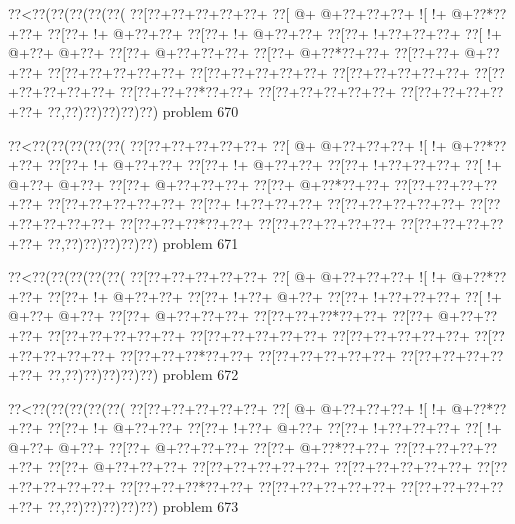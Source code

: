 \vbox{\vbox{\goo
\0??<\0??(\0??(\0??(\0??(\0??(
\0??[\0??+\0??+\0??+\0??+\0??+
\0??[\- @+\- @+\0??+\0??+\0??+
\- ![\- !+\- @+\0??*\0??+\0??+
\0??[\0??+\- !+\- @+\0??+\0??+
\0??[\0??+\- !+\- @+\0??+\0??+
\0??[\0??+\- !+\0??+\0??+\0??+
\0??[\- !+\- @+\0??+\- @+\0??+
\0??[\0??+\- @+\0??+\0??+\0??+
\0??[\0??+\- @+\0??*\0??+\0??+
\0??[\0??+\0??+\- @+\0??+\0??+
\0??[\0??+\0??+\0??+\0??+\0??+
\0??[\0??+\0??+\0??+\0??+\0??+
\0??[\0??+\0??+\0??+\0??+\0??+
\0??[\0??+\0??+\0??+\0??+\0??+
\0??[\0??+\0??+\0??*\0??+\0??+
\0??[\0??+\0??+\0??+\0??+\0??+
\0??[\0??+\0??+\0??+\0??+\0??+
\0??,\0??)\0??)\0??)\0??)\0??)
}
\hfil problem 670\hfil\break
}

\vbox{\vbox{\goo
\0??<\0??(\0??(\0??(\0??(\0??(
\0??[\0??+\0??+\0??+\0??+\0??+
\0??[\- @+\- @+\0??+\0??+\0??+
\- ![\- !+\- @+\0??*\0??+\0??+
\0??[\0??+\- !+\- @+\0??+\0??+
\0??[\0??+\- !+\- @+\0??+\0??+
\0??[\0??+\- !+\0??+\0??+\0??+
\0??[\- !+\- @+\0??+\- @+\0??+
\0??[\0??+\- @+\0??+\0??+\0??+
\0??[\0??+\- @+\0??*\0??+\0??+
\0??[\0??+\0??+\0??+\0??+\0??+
\0??[\0??+\0??+\0??+\0??+\0??+
\0??[\0??+\- !+\0??+\0??+\0??+
\0??[\0??+\0??+\0??+\0??+\0??+
\0??[\0??+\0??+\0??+\0??+\0??+
\0??[\0??+\0??+\0??*\0??+\0??+
\0??[\0??+\0??+\0??+\0??+\0??+
\0??[\0??+\0??+\0??+\0??+\0??+
\0??,\0??)\0??)\0??)\0??)\0??)
}
\hfil problem 671\hfil\break
}

\vbox{\vbox{\goo
\0??<\0??(\0??(\0??(\0??(\0??(
\0??[\0??+\0??+\0??+\0??+\0??+
\0??[\- @+\- @+\0??+\0??+\0??+
\- ![\- !+\- @+\0??*\0??+\0??+
\0??[\0??+\- !+\- @+\0??+\0??+
\0??[\0??+\- !+\0??+\- @+\0??+
\0??[\0??+\- !+\0??+\0??+\0??+
\0??[\- !+\- @+\0??+\- @+\0??+
\0??[\0??+\- @+\0??+\0??+\0??+
\0??[\0??+\0??+\0??*\0??+\0??+
\0??[\0??+\- @+\0??+\0??+\0??+
\0??[\0??+\0??+\0??+\0??+\0??+
\0??[\0??+\0??+\0??+\0??+\0??+
\0??[\0??+\0??+\0??+\0??+\0??+
\0??[\0??+\0??+\0??+\0??+\0??+
\0??[\0??+\0??+\0??*\0??+\0??+
\0??[\0??+\0??+\0??+\0??+\0??+
\0??[\0??+\0??+\0??+\0??+\0??+
\0??,\0??)\0??)\0??)\0??)\0??)
}
\hfil problem 672\hfil\break
}

\vbox{\vbox{\goo
\0??<\0??(\0??(\0??(\0??(\0??(
\0??[\0??+\0??+\0??+\0??+\0??+
\0??[\- @+\- @+\0??+\0??+\0??+
\- ![\- !+\- @+\0??*\0??+\0??+
\0??[\0??+\- !+\- @+\0??+\0??+
\0??[\0??+\- !+\0??+\- @+\0??+
\0??[\0??+\- !+\0??+\0??+\0??+
\0??[\- !+\- @+\0??+\- @+\0??+
\0??[\0??+\- @+\0??+\0??+\0??+
\0??[\0??+\- @+\0??*\0??+\0??+
\0??[\0??+\0??+\0??+\0??+\0??+
\0??[\0??+\- @+\0??+\0??+\0??+
\0??[\0??+\0??+\0??+\0??+\0??+
\0??[\0??+\0??+\0??+\0??+\0??+
\0??[\0??+\0??+\0??+\0??+\0??+
\0??[\0??+\0??+\0??*\0??+\0??+
\0??[\0??+\0??+\0??+\0??+\0??+
\0??[\0??+\0??+\0??+\0??+\0??+
\0??,\0??)\0??)\0??)\0??)\0??)
}
\hfil problem 673\hfil\break
}

